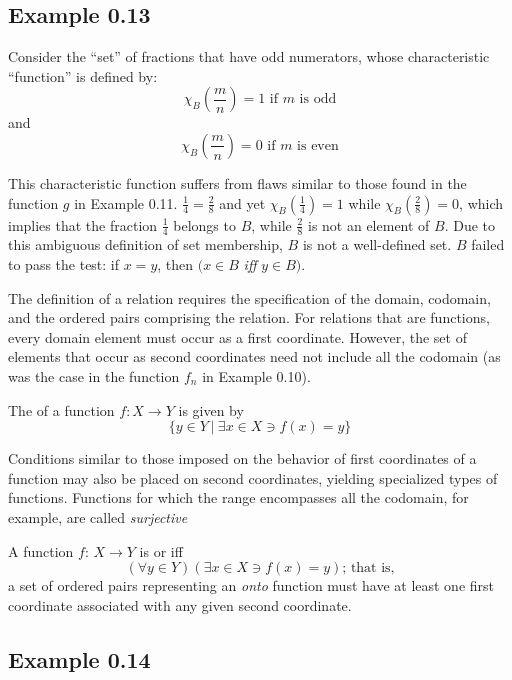 \subsection*{Example 0.13}

Consider the ``set'' of fractions that have odd numerators, whose characteristic
``function'' is defined by:
\[\chi_{B}\left(\frac{m}{n}\right) = 1\text{ if $m$ is odd}\]
and
\[\chi_{B}\left(\frac{m}{n}\right) = 0\text{ if $m$ is even}\]

This characteristic function suffers from flaws similar to those found in the
function $g$ in Example 0.11. $\frac{1}{4} = \frac{2}{8}$ and yet
$\chi_B \left(\frac{1}{4}\right) = 1$ while $\chi_B \left(\frac{2}{8}\right) = 0$,
which implies that the fraction $\frac{1}{4}$ belongs to $B$, while
$\frac{2}{8}$ is not an element of $B$. Due to this ambiguous definition of set
membership, $B$ is not a well-defined set. $B$ failed to pass the test: if
$x = y$, then $(x \in B$ \emph{iff} $y\in B)$.

The definition of a relation requires the specification of the domain, codomain,
and the ordered pairs comprising the relation. For relations that are functions,
every domain element must occur as a first coordinate. However, the set of
elements that occur as second coordinates need not include all the codomain
(as was the case in the function $f_n$ in Example 0.10).

\begin{dfn}\label{dfn-0.13}
The \emph{} of a function $f: X \rightarrow Y$ is given by
\[\{y \in Y\ |\  \exists x \in X \ni f(x) = y\}\]
\end{dfn}

Conditions similar to those imposed on the behavior of first coordinates of a
function may also be placed on second coordinates, yielding specialized types
of functions. Functions for which the range encompasses all the codomain, for
example, are called \emph{surjective}

\begin{dfn}\label{dfn-0.14}
A function $f$: $X \rightarrow Y$ is \emph{} or
\emph{} iff
\[(\forall y \in Y)(\exists x \in X \ni  f(x) = y)\text{; that is,}\]
a set of ordered pairs representing an \emph{onto} function must have at least
one first coordinate associated with any given second coordinate.
\end{dfn}

\subsection*{Example 0.14}

